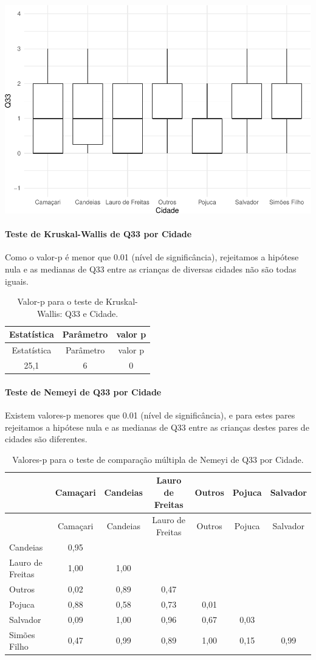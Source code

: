 \documentclass[]{article}
\let\oldparagraph\paragraph
\renewcommand{\paragraph}[1]{\oldparagraph{#1}\mbox{}}
\begin{document}
\begin{center}\includegraphics[width=0.75\linewidth]{relatorio_covid19_files/figure-latex/unnamed-chunk-1139-1} \end{center}

\hypertarget{teste-de-kruskal-wallis-de-q33-por-cidade}{%
\paragraph{Teste de Kruskal-Wallis de Q33 por Cidade}\label{teste-de-kruskal-wallis-de-q33-por-cidade}}

Como o valor-p é menor que 0.01 (nível de significância), rejeitamos a hipótese nula e as medianas de Q33 entre as crianças de diversas cidades não são todas iguais.

\begin{longtable}[]{@{}ccc@{}}
\caption{\label{tab:unnamed-chunk-1141}Valor-p para o teste de Kruskal-Wallis: Q33 e Cidade.}\tabularnewline
\toprule
Estatística & Parâmetro & valor p\tabularnewline
\midrule
\endfirsthead
\toprule
Estatística & Parâmetro & valor p\tabularnewline
\midrule
\endhead
25,1 & 6 & 0\tabularnewline
\bottomrule
\end{longtable}

\hypertarget{teste-de-nemeyi-de-q33-por-cidade}{%
\paragraph{Teste de Nemeyi de Q33 por Cidade}\label{teste-de-nemeyi-de-q33-por-cidade}}

Existem valores-p menores que 0.01 (nível de significância), e para estes pares rejeitamos a hipótese nula e as medianas de Q33 entre as crianças destes pares de cidades são diferentes.

\begin{longtable}[]{@{}lcccccc@{}}
\caption{\label{tab:unnamed-chunk-1143}Valores-p para o teste de comparação múltipla de Nemeyi de Q33 por Cidade.}\tabularnewline
\toprule
& Camaçari & Candeias & Lauro de Freitas & Outros & Pojuca & Salvador\tabularnewline
\midrule
\endfirsthead
\toprule
& Camaçari & Candeias & Lauro de Freitas & Outros & Pojuca & Salvador\tabularnewline
\midrule
\endhead
Candeias & 0,95 & & & & &\tabularnewline
Lauro de Freitas & 1,00 & 1,00 & & & &\tabularnewline
Outros & 0,02 & 0,89 & 0,47 & & &\tabularnewline
Pojuca & 0,88 & 0,58 & 0,73 & 0,01 & &\tabularnewline
Salvador & 0,09 & 1,00 & 0,96 & 0,67 & 0,03 &\tabularnewline
Simões Filho & 0,47 & 0,99 & 0,89 & 1,00 & 0,15 & 0,99\tabularnewline
\bottomrule
\end{longtable}
\end{document}
